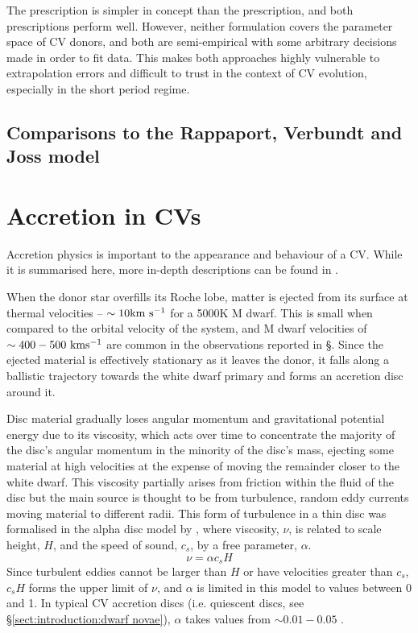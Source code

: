 The \citet{garraffo2018a} prescription is simpler in concept than the \citet{matt2015} prescription, and both prescriptions perform well. However, neither formulation covers the parameter space of CV donors, and both are semi-empirical with some arbitrary decisions made in order to fit data. This makes both approaches highly vulnerable to extrapolation errors and difficult to trust in the context of CV evolution, especially in the short period regime.


\subsection{Comparisons to the Rappaport, Verbundt and Joss model}


\section{Accretion in CVs}
\label{sect:introduction:accretion}
Accretion physics is important to the appearance and behaviour of a CV. While it is summarised here, more in-depth descriptions can be found in \citet{warner1995, hellier2001, ritter2010}.

When the donor star overfills its Roche lobe, matter is ejected from its surface at thermal velocities -- $\sim 10 \rm km\ s^{-1}$ for a 5000K M dwarf. This is small when compared to the orbital velocity of the system, and M dwarf velocities of $\sim 400-500 \rm\ km s^{-1}$ are common in the observations reported in \S{}. Since the ejected material is effectively stationary as it leaves the donor, it falls along a ballistic trajectory towards the white dwarf primary and forms an accretion disc around it. 

Disc material gradually loses angular momentum and gravitational potential energy due to its viscosity, which acts over time to concentrate the majority of the disc's angular momentum in the minority of the disc's mass, ejecting some material at high velocities at the expense of moving the remainder closer to the white dwarf. This viscosity partially arises from friction within the fluid of the disc but the main source is thought to be from turbulence, random eddy currents moving material to different radii. This form of turbulence in a thin disc was formalised in the alpha disc model by \citet{shakura1973}, where viscosity, $\nu$, is related to scale height, $H$, and the speed of sound, $c_s$, by a free parameter, $\alpha$.
\begin{equation}
    \label{eqn:disc viscocity}
    \nu = \alpha c_s H
\end{equation}
Since turbulent eddies cannot be larger than $H$ or have velocities greater than $c_s$, $c_s H$ forms the upper limit of $\nu$, and $\alpha$ is limited in this model to values between 0 and 1. In typical CV accretion discs (i.e. quiescent discs, see \S\ref{sect:introduction:dwarf novae}), $\alpha$ takes values from $\sim 0.01 - 0.05$ \citet{hellier2001}.

